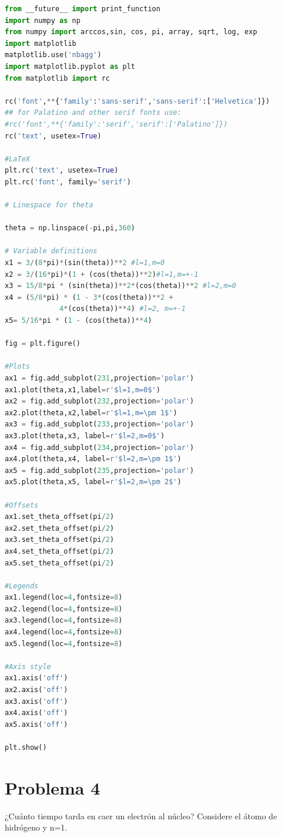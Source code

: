 \documentclass[a4paper,11pt]{article}
\numberwithin{equation}{section}
\begin{document}
\begin{lstlisting}[language=Python]
 from __future__ import print_function
import numpy as np
from numpy import arccos,sin, cos, pi, array, sqrt, log, exp
import matplotlib
matplotlib.use('nbagg')
import matplotlib.pyplot as plt
from matplotlib import rc

rc('font',**{'family':'sans-serif','sans-serif':['Helvetica']})
## for Palatino and other serif fonts use:
#rc('font',**{'family':'serif','serif':['Palatino']})
rc('text', usetex=True)

#LaTeX
plt.rc('text', usetex=True)
plt.rc('font', family='serif')

# Linespace for theta

theta = np.linspace(-pi,pi,360)

# Variable definitions
x1 = 3/(8*pi)*(sin(theta))**2 #l=1,m=0
x2 = 3/(16*pi)*(1 + (cos(theta))**2)#l=1,m=+-1
x3 = 15/8*pi * (sin(theta))**2*(cos(theta))**2 #l=2,m=0
x4 = (5/8*pi) * (1 - 3*(cos(theta))**2 + 
             4*(cos(theta))**4) #l=2, m=+-1
x5= 5/16*pi * (1 - (cos(theta))**4)

fig = plt.figure()

#Plots
ax1 = fig.add_subplot(231,projection='polar')
ax1.plot(theta,x1,label=r'$l=1,m=0$')
ax2 = fig.add_subplot(232,projection='polar')
ax2.plot(theta,x2,label=r'$l=1,m=\pm 1$')
ax3 = fig.add_subplot(233,projection='polar')
ax3.plot(theta,x3, label=r'$l=2,m=0$')
ax4 = fig.add_subplot(234,projection='polar')
ax4.plot(theta,x4, label=r'$l=2,m=\pm 1$')
ax5 = fig.add_subplot(235,projection='polar')
ax5.plot(theta,x5, label=r'$l=2,m=\pm 2$')

#Offsets
ax1.set_theta_offset(pi/2)
ax2.set_theta_offset(pi/2)
ax3.set_theta_offset(pi/2)
ax4.set_theta_offset(pi/2)
ax5.set_theta_offset(pi/2)

#Legends
ax1.legend(loc=4,fontsize=8)
ax2.legend(loc=4,fontsize=8)
ax3.legend(loc=4,fontsize=8)
ax4.legend(loc=4,fontsize=8)
ax5.legend(loc=4,fontsize=8)

#Axis style
ax1.axis('off')
ax2.axis('off')
ax3.axis('off')
ax4.axis('off')
ax5.axis('off')

plt.show()
\end{lstlisting}

\newpage

\section{Problema 4}

¿Cuánto tiempo tarda en caer un electrón al núcleo? Considere el átomo de hidrógeno 
y n=1.
\end{document}
